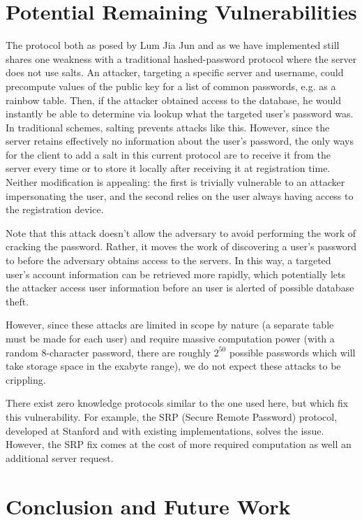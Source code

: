 \documentclass[11pt]{article}
\begin{document}
\normalsize

\section{Potential Remaining Vulnerabilities}

The protocol both as posed by Lum Jia Jun and as we have implemented still shares one weakness with a traditional hashed-password protocol where the server does not use salts.  An attacker, targeting a specific server and username, could precompute values of the public key for a list of common passwords, e.g. as a rainbow table.  Then, if the attacker obtained access to the database, he would instantly be able to determine via lookup what the targeted user's password was.  In traditional schemes, salting prevents attacks like this.  However, since the server retains effectively no information about the user's password, the only ways for the client to add a salt in this current protocol are to receive it from the server every time or to store it locally after receiving it at registration time.  Neither modification is appealing: the first is trivially vulnerable to an attacker impersonating the user, and the second relies on the user always having access to the registration device.

Note that this attack doesn't allow the adversary to avoid performing the work of cracking the password.  Rather, it moves the work of discovering a user's password to before the adversary obtains access to the servers.  In this way, a targeted user's account information can be retrieved more rapidly, which potentially lets the attacker access user information before an user is alerted of possible database theft.

However, since these attacks are limited in scope by nature (a separate table must be made for each user) and require massive computation power (with a random 8-character password, there are roughly $2^50$ possible passwords which will take storage space in the exabyte range), we do not expect these attacks to be crippling.

There exist zero knowledge protocols similar to the one used here, but which fix this vulnerability.  For example, the SRP (Secure Remote Password) protocol, developed at Stanford and with existing implementations, solves the issue.  However, the SRP fix comes at the cost of more required computation as well an additional server request. \cite{Wu} 

\section{Conclusion and Future Work}
\end{document}
